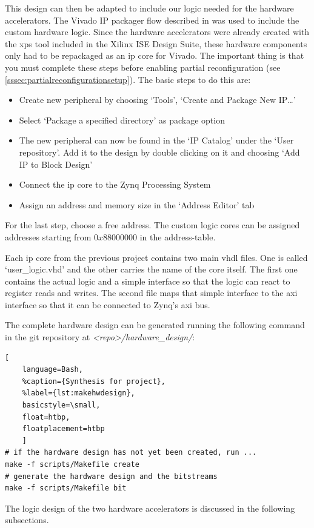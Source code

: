 This design can then be adapted to include our logic needed for the hardware accelerators. The Vivado IP packager flow described in \cite{UG1118} was used to include the custom hardware logic. Since the hardware accelerators were already created with the \gls{xps} tool included in the Xilinx ISE Design Suite, these hardware components only had to be repackaged as an \gls{ip} core for Vivado. The important thing is that you must complete these steps before enabling partial reconfiguration (see \cref{sssec:partialreconfigurationsetup}).
The basic steps to do this are:
\begin{itemize}
	\item Create new peripheral by choosing `Tools', `Create and Package New IP\ldots'
	\item Select `Package a specified directory' as package option
	\item The new peripheral can now be found in the `IP Catalog'
		under the `User repository'.
		Add it to the design by double clicking on it and choosing `Add IP to Block Design'
	\item Connect the \gls{ip} core to the Zynq Processing System
	\item Assign an address and memory size in the `Address Editor' tab
\end{itemize}
For the last step, choose a free address.
The custom logic cores can be assigned addresses starting from $0x88000000$ in the address-table.

Each \gls{ip} core from the previous project contains two main \gls{vhdl} files.
One is called `user\_logic.vhd' and the other carries the name of the core
itself.
The first one contains the actual logic and a simple interface so that the logic can react to register reads and writes.
The second file maps that simple interface to the \gls{axi} interface so that it can be connected to Zynq's \gls{axi} bus.

The complete hardware design can be generated running the following command in the git repository at \emph{<repo>/hardware\_design/}:

\begin{lstlisting}[
	language=Bash,
	%caption={Synthesis for project},
	%label={lst:makehwdesign},
	basicstyle=\small,
	float=htbp,
	floatplacement=htbp
	]
# if the hardware design has not yet been created, run ...
make -f scripts/Makefile create
# generate the hardware design and the bitstreams
make -f scripts/Makefile bit
\end{lstlisting}

The logic design of the two hardware accelerators is discussed in the following
subsections.
